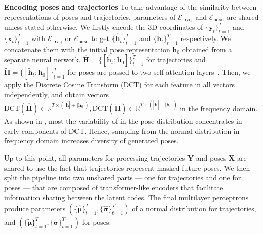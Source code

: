 \documentclass[10pt,twocolumn,letterpaper]{article}
\newcommand{\code}[1]{\texttt{#1}}
\renewcommand{\bar}[1]{\widetilde{#1}}
\renewcommand{\hat}[1]{\widehat{#1}}
\renewcommand{\paragraph}[1]{\noindent\textbf{#1}\enskip}
\begin{document}
\paragraph{Encoding poses and trajectories}
To take advantage of the similarity between representations of poses and trajectories, parameters of $\mathcal{E}_\code{traj}$ and $\mathcal{E}_\code{pose}$ are shared unless stated otherwise. We firstly encode the 3D coordinates of $\{\mathbf{y}_t\}_{t=1}^{T}$ and $\{\mathbf{x}_t\}_{t=1}^{T}$ with $\mathcal{E}_\code{traj}$ or $\mathcal{E}_\code{pose}$ to get $\{\hat{\mathbf{h}}_t\}^T_{t=1}$ and $\{\bar{\mathbf{h}}_t\}^T_{t=1}$ respectively.
We concatenate them with the initial pose representation $\mathbf{h}_0$ obtained from a separate neural network. $\hat{\mathbf{H}} = \{[\hat{\mathbf{h}}_t; \mathbf{h}_0]\}^T_{t=1}$ for trajectories and $\bar{\mathbf{H}} = \{[\bar{\mathbf{h}}_t; \mathbf{h}_0]\}^T_{t=1}$ for poses are passed to two self-attention layers~\cite{vaswani2017attention}. 
Then, we apply the Discrete Cosine Transform (DCT) for each feature in all vectors independently, and obtain vectors $\text{DCT}(\hat{\mathbf{H}})\in \mathbb{R}^{T\times (|\hat{\mathbf{h}}| + |\mathbf{h}_0|)}, \text{DCT}(\bar{\mathbf{{H}}}) \in \mathbb{R}^{T\times (|\bar{\mathbf{h}}| + |\mathbf{h}_0|)}$ in the frequency domain. As shown in \cite{zhang2020we}, most the variability of in the pose distribution concentrates in early components of DCT. Hence, sampling from the normal distribution in frequency domain increases diversity of generated poses.

Up to this point, all parameters for processing trajectories $\mathbf{Y}$ and poses $\mathbf{X}$ are shared to use the fact that trajectories represent masked future poses. We then split the pipeline into two unshared parts --- one for trajectories and one for poses --- that are composed of transformer-like encoders that facilitate information sharing between the latent codes.  The final multilayer perceptrons produce parameters $\left(\{\hat{\bm{\mu}}\}_{t=1}^T, \{\hat{\bm{\sigma}}\}_{t=1}^T\right)$ of a normal distribution for trajectories, and $\left(\{\bar{\bm{\mu}}\}_{t=1}^T, \{\bar{\bm{\sigma}}\}_{t=1}^T\right)$ for poses.
\end{document}
